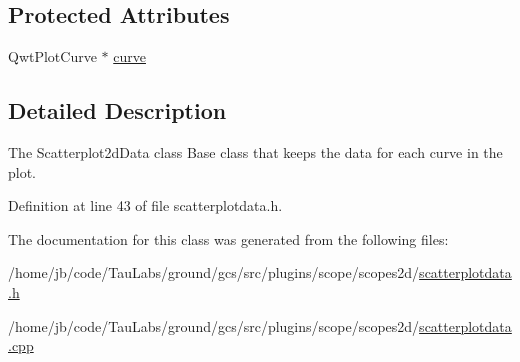 \subsection*{\-Protected \-Attributes}
\begin{DoxyCompactItemize}
\item 
\-Qwt\-Plot\-Curve $\ast$ \hyperlink{group___scope_plugin_ga4a0647f875271067323cf2ad3868afa4}{curve}
\end{DoxyCompactItemize}


\subsection{\-Detailed \-Description}
\-The \-Scatterplot2d\-Data class \-Base class that keeps the data for each curve in the plot. 

\-Definition at line 43 of file scatterplotdata.\-h.



\-The documentation for this class was generated from the following files\-:\begin{DoxyCompactItemize}
\item 
/home/jb/code/\-Tau\-Labs/ground/gcs/src/plugins/scope/scopes2d/\hyperlink{scatterplotdata_8h}{scatterplotdata.\-h}\item 
/home/jb/code/\-Tau\-Labs/ground/gcs/src/plugins/scope/scopes2d/\hyperlink{scatterplotdata_8cpp}{scatterplotdata.\-cpp}\end{DoxyCompactItemize}
